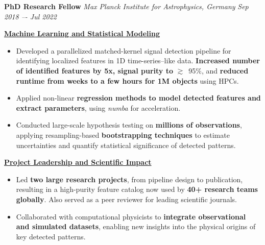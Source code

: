 \documentclass[a4paper,10pt]{article}
\begin{document}
\vspace{2mm}
\textcolor{sectionblue}{\textbf{PhD Research Fellow}} \hfill 
\textcolor{sectionblue}{\textit{Max Planck Institute for Astrophysics, Germany}} \hfill 
\textcolor{sectionblue}{\textit{Sep 2018 –- Jul 2022}}

\vspace{2mm}
\begin{adjustwidth}{1em}{0pt}

\textcolor{sectionblue}{\textbf{\underline{Machine Learning and Statistical Modeling}}}
\begin{itemize}[leftmargin=*, itemsep=2pt]
    \item Developed a parallelized matched-kernel signal detection pipeline for identifying localized features in 1D time-series–like data. \textbf{Increased number of identified features by 5x, signal purity to} $\gtrsim$~95\%, and \textbf{reduced runtime from weeks to a few hours for 1M objects} using HPCs.
     \vspace{-0.5mm}
    \item Applied non-linear \textbf{regression methods to model detected features and extract parameters}, using \textit{numba} for acceleration.
     \vspace{-0.5mm}
    \item Conducted large-scale hypothesis testing on \textbf{millions of observations}, applying resampling-based \textbf{bootstrapping techniques} to estimate uncertainties and quantify statistical significance of detected patterns.
\end{itemize}

\vspace{2pt}
\textcolor{sectionblue}{\textbf{\underline{Project Leadership and Scientific Impact}}}
\begin{itemize}[leftmargin=*, itemsep=2pt]
   \item Led \textbf{two large research projects}, from pipeline design to publication, resulting in a high-purity feature catalog now used by \textbf{40+ research teams globally}. Also served as a peer reviewer for leading scientific journals.
    \vspace{-0.5mm}
    \item Collaborated with computational physicists to \textbf{integrate observational and simulated datasets}, enabling new insights into the physical origins of key detected patterns.
\end{itemize}
\end{adjustwidth}
\vspace*{-4.5mm}
\end{document}
